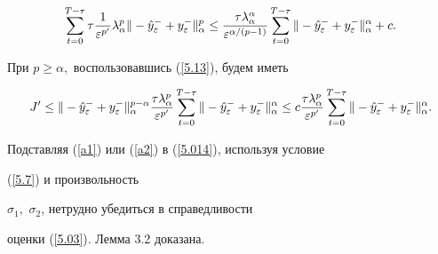 \begin{pf}
\begin{equation}
\sum^{T-\tau}_{t=0}\tau


\frac{1}{\varepsilon^{p'}} \lambda^p_\alpha


\|


-\Hat{y}_\varepsilon^{-} + y_\varepsilon^{-}


 \|^p_\alpha


 \le \frac{\tau \lambda^\alpha_\alpha}{\varepsilon^{\alpha/(p-1)}}


\sum^{T-\tau}_{t=0}


\|


-\Hat{y}_\varepsilon^{-} + y_\varepsilon^{-}


\|^\alpha_\alpha + c.\label{a1}


\end{equation}





При  $p\ge \alpha,$ воспользовавшись (\ref{5.13}), будем иметь


\begin{equation}


J' \le


\|


-\Hat{y}_\varepsilon^{-} + y_\varepsilon^{-}


\|^{p-\alpha}_\alpha


 \frac{\tau \lambda^p_\alpha}{\varepsilon^{p'}}


\sum^{T-\tau}_{t=0}


\|


-\Hat{y}_\varepsilon^{-} + y_\varepsilon^{-}


\|^\alpha_\alpha \le


c \frac{\tau \lambda^p_\alpha}{\varepsilon^{p'}}


\sum^{T-\tau}_{t=0}


\|


-\Hat{y}_\varepsilon^{-} + y_\varepsilon^{-}


\|^\alpha_\alpha .\label{a2}


\end{equation}


Подставляя (\ref{a1}) или (\ref{a2}) в (\ref{5.014}), используя условие


(\ref{5.7}) и произвольность


$\sigma_1,$ $\sigma_2$, нетрудно убедиться в справедливости


оценки (\ref{5.03}). Лемма 3.2 доказана.\end{pf}


